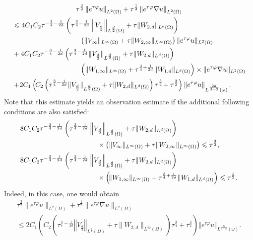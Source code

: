 \documentclass[AHL,Unicode,longabstracts]{cedram}
\newcommand{\norm}[1]{\left\Vert#1\right\Vert}
\renewcommand{\leq}{\leqslant}
\begin{document}
\begin{multline*}
\tau^{\frac{3}{2}} \norm{ e^{\tau \varphi} u }_{L^2(\Omega)} +
\tau^{\frac{1}{2}} \norm{e^{\tau \varphi} \nabla u }_{L^2(\Omega)}
\\
\begin{aligned}
& \leq 4C_1 C_2 \tau^{-\frac{3}{4} - \frac{1}{2d}} 
\left(\tau^{\frac{3}{4}-\frac{1}{2d}} \norm{ V_{\frac{d}{2}}}_{L^{\frac{d}{2}}(\Omega)} + \tau \| W_{2, d}\|_{L^d(\Omega)} \right)\\
&\mkern175mu
\left(\| V_\infty \|_{L^\infty(\Omega)} + \tau \| W_{2, \infty}\|_{L^\infty(\Omega)} \right)
\| e^{\tau \varphi} u \|_{L^2(\Omega)}
\\ &
 +   4 C_1 C_2 \tau^{-\frac{3}{4} - \frac{1}{2d}} 
\left( \tau^{\frac{3}{4}-\frac{1}{2d}} \| V_{\frac{d}{2}} \|_{L^{\frac{d}{2}}(\Omega)} +  \tau \| W_{2, d}\|_{L^d(\Omega)} \right)  
\\
&\mkern175mu
\left( \| W_{1,\infty} \|_{L^\infty(\Omega)} + \tau^{\frac{3}{4}+\frac{1}{2d}} \| W_{1,d} \|_{L^d(\Omega)} \right)
\times
\| e^{\tau \varphi} \nabla u \|_{L^2(\Omega)}
\\
& + \! 2 C_1\left(\! C_2 \left(\tau^{\frac{3}{4}-\frac{1}{2d}} \| V_{\frac{d}{2}} \|_{L^{\frac{d}{2}}(\Omega)} + \tau \| W_{2, d}\|_{L^d(\Omega)} \right) \tau^{\frac{3}{4}}\! + \tau^{\frac{3}{2}}\right)
\norm{e^{\tau \varphi} u}_{L^{\frac{2d}{d-2}} (\omega)}.
\end{aligned}
\end{multline*}
Note that this estimate yields an observation estimate if the additional following conditions are also satisfied:
\begin{align}
& 8 C_1 C_2 \tau^{-\frac{3}{4} - \frac{1}{2d}}
\left(\tau^{\frac{3}{4}-\frac{1}{2d}} \norm{ V_{\frac{d}{2}} }_{L^{\frac{d}{2}}(\Omega)} + \tau \| W_{2, d}\|_{L^d(\Omega)} \right)
\label{Condition-4}
\\
& \mkern200mu\times
\left(\| V_\infty \|_{L^\infty(\Omega)}+ \tau \| W_{2, \infty}\|_{L^\infty(\Omega)} \right)
\leq \tau^{\frac{3}{2}},
\notag
\\
& 8 C_1 C_2 \tau^{-\frac{3}{4} - \frac{1}{2d}}
\left(\tau^{\frac{3}{4}-\frac{1}{2d}} \norm{ V_{\frac{d}{2}}}_{L^{\frac{d}{2}}(\Omega)} + \tau \| W_{2, d}\|_{L^d(\Omega)} \right)
\label{Condition-5}
\\
& \mkern200mu\times
\left(\! \| W_{1,\infty} \|_{L^\infty(\Omega)}+\tau^{\frac{3}{4}+\frac{1}{2d}} \| W_{1,d} \|_{L^d(\Omega)} \right)
\leq \tau^{\frac{1}{2}}.\notag
\end{align}
Indeed, in this case, one would obtain
\begin{multline}\label{Carleman-General-appl-final}
\tau^{\frac{3}{2}} \| e^{\tau \varphi} u \|_{L^2(\Omega)} +
\tau^{\frac{1}{2}} \| e^{\tau \varphi} \nabla u \|_{L^2(\Omega)}\\
\leq 2 C_1\left(C_2 \left(\tau^{\frac{3}{4}-\frac{1}{2d}} \norm{ V_{\frac{d}{2}} }_{L^{\frac{d}{2}}(\Omega)} + \tau \| W_{2, d}\|_{L^\infty(\Omega)} \right) \tau^{\frac{3}{4}} + \tau^{\frac{3}{2}}\right) \norm{ e^{\tau \varphi} u}_{L^{\frac{2d}{d-2}} (\omega)}.
\end{multline}
\end{document}
